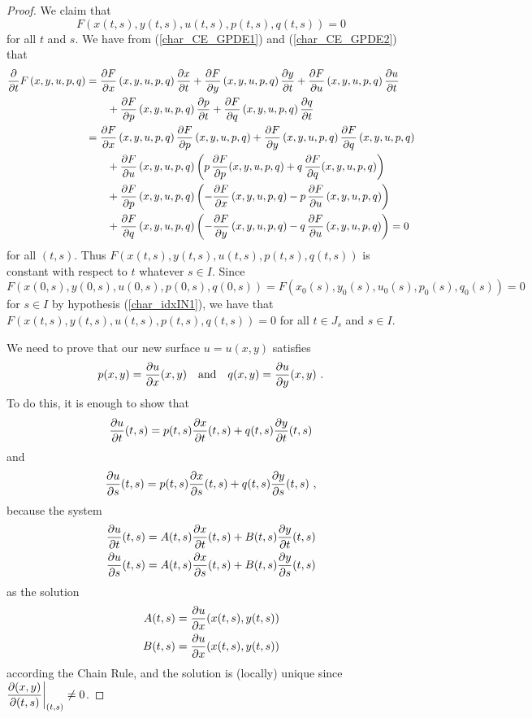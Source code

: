 \begin{proof}
 We claim that
\begin{equation} \label{char_idxCON3}
F\left(x(t,s),y(t,s),u(t,s),p(t,s),q(t,s)\right)=0
\end{equation}
for all $t$ and $s$.  We have from (\ref{char_CE_GPDE1}) and
(\ref{char_CE_GPDE2}) that
\begin{align*}
\pdfdx{F\left(x,y,u,p,q\right)}{t}
&= \pdydx{F}{x}\left(x,y,u,p,q\right)\pdydx{x}{t}
+\pdydx{F}{y}\left(x,y,u,p,q\right)\pdydx{y}{t}
+\pdydx{F}{u}\left(x,y,u,p,q\right)\pdydx{u}{t} \\
& \qquad +\pdydx{F}{p}\left(x,y,u,p,q\right)\pdydx{p}{t}
+\pdydx{F}{q}\left(x,y,u,p,q\right)\pdydx{q}{t} \\
&=\pdydx{F}{x}\left(x,y,u,p,q\right)\pdydx{F}{p}\left(x,y,u,p,q\right)
+\pdydx{F}{y}\left(x,y,u,p,q\right)\pdydx{F}{q}\left(x,y,u,p,q\right) \\
&\qquad +\pdydx{F}{u}\left(x,y,u,p,q\right)\left(
p\, \pdydx{F}{p}(x,y,u,p,q) + q\,\pdydx{F}{q}(x,y,u,p,q)\right) \\
&\qquad +\pdydx{F}{p}\left(x,y,u,p,q\right)\left(
-\pdydx{F}{x}\left(x,y,u,p,q\right) -p\,\pdydx{F}{u}\left(x,y,u,p,q\right)
\right) \\
&\qquad +\pdydx{F}{q}\left(x,y,u,p,q\right)\left(
-\pdydx{F}{y}\left(x,y,u,p,q\right)- q\,\pdydx{F}{u}\left(x,y,u,p,q\right)
\right) =0
\end{align*}
for all $(t,s)$.  Thus $F\left(x(t,s),y(t,s),u(t,s),p(t,s),q(t,s)\right)$
is constant with respect to $t$ whatever $s \in I$.  Since  
\[
F\left(x(0,s),y(0,s),u(0,s),p(0,s),q(0,s)\right)=
F\left(x_0(s),y_0(s),u_0(s),p_0(s),q_0(s)\right)= 0
\]
for $s\in I$ by hypothesis (\ref{char_idxIN1}), we have that
$F\left(x(t,s),y(t,s),u(t,s),p(t,s),q(t,s)\right) = 0$ for all $t \in J_s$
and $s\in  I$.

 We need to prove that our new surface $u=u(x,y)$ satisfies
\[
p(x,y) = \pdydx{u}{x}(x,y) \quad \text{and} \quad
q(x,y) = \pdydx{u}{y}(x,y) \ .
\]
To do this, it is enough to show that
\begin{equation} \label{char_idxCON2}
\pdydx{u}{t}(t,s) = p(t,s)\pdydx{x}{t}(t,s) + q(t,s) \pdydx{y}{t}(t,s)
\end{equation}
and
\begin{equation} \label{char_idxCON1}
\pdydx{u}{s}(t,s) = p(t,s)\pdydx{x}{s}(t,s) + q(t,s) \pdydx{y}{s}(t,s) \ ,
\end{equation}
because the system
\begin{align*}
\pdydx{u}{t}(t,s) &= A(t,s)\pdydx{x}{t}(t,s) + B(t,s)
\pdydx{y}{t}(t,s) \\
\pdydx{u}{s}(t,s) &= A(t,s)\pdydx{x}{s}(t,s) + B(t,s) \pdydx{y}{s}(t,s)
\end{align*}
as the solution
\begin{align*}
A(t,s) &= \pdydx{u}{x}(x(t,s),y(t,s)) \\
B(t,s) &= \pdydx{u}{x}(x(t,s),y(t,s))
\end{align*}
according the Chain Rule, and the solution is (locally) unique since
$\DS \frac{\partial(x,y)}{\partial(t,s)}\bigg|_{(t,s)} \neq 0$.


\end{proof}
